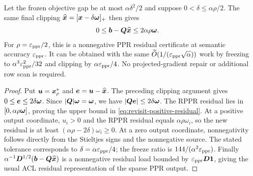 \begin{corollary}
\label{cor:revisit-positive-residual}
Let the frozen objective gap be at most $\alpha\delta^2/2$ and suppose
$0<\delta\leq\alpha\rho/2$. The same final clipping
$\widehat{\bm{x}}=[\bm{x}-\delta\bm{\omega}]_+$ then gives
\begin{equation}
 0\leq\bm{b}-\bm{Q}\widehat{\bm{x}}\leq2\alpha\rho\bm{\omega}.
 \label{eq:revisit-positive-residual}
\end{equation}
For $\rho=\varepsilon_{\mathrm{ppr}}/2$, this is a nonnegative PPR residual certificate
at semantic accuracy $\varepsilon_{\mathrm{ppr}}$. It can be obtained with the same
$\widetilde O(1/(\varepsilon_{\mathrm{ppr}}\sqrt\alpha))$ work by freezing to
$\alpha^3\varepsilon_{\mathrm{ppr}}^2/32$ and clipping by $\alpha\varepsilon_{\mathrm{ppr}}/4$.
No projected-gradient repair or additional row scan is required.
\end{corollary}
\begin{proof}
Put $\bm{u}=\bm{x}_\rho^*$ and $\bm{e}=\bm{u}-\widehat{\bm{x}}$.
The preceding clipping argument gives $0\leq\bm{e}\leq2\delta\bm{\omega}$.
Since $|\bm{Q}|\bm{\omega}=\bm{\omega}$, we have
$|\bm{Q}\bm{e}|\leq2\delta\bm{\omega}$.
The RPPR residual lies in $[0,\alpha\rho\bm{\omega}]$, proving the upper
bound in \cref{eq:revisit-positive-residual}.
At a positive output coordinate, $u_i>0$ and the RPPR residual equals
$\alpha\rho\omega_i$, so the new residual is at least
$(\alpha\rho-2\delta)\omega_i\geq0$.
At a zero output coordinate, nonnegativity follows directly from the
Stieltjes signs and the nonnegative source.
The stated tolerance corresponds to $\delta=\alpha\varepsilon_{\mathrm{ppr}}/4$;
the freeze ratio is $144/(\alpha^2\varepsilon_{\mathrm{ppr}})$.
Finally $\alpha^{-1}\bm{D}^{1/2}(\bm{b}-\bm{Q}\widehat{\bm{x}})$ is a nonnegative
residual load bounded by $\varepsilon_{\mathrm{ppr}}\bm{D}\mathbf{1}$, giving the usual ACL
residual representation of the sparse PPR output.
\end{proof}

